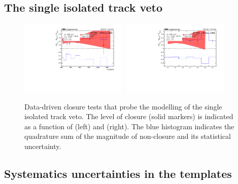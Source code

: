 \clearpage
\subsection{The single isolated track veto}

\begin{figure}[h!]
  \begin{center}
    \includegraphics[width=0.45\textwidth]{figures/closureTests/SITV/DoubleMu_Sit_ht.pdf}~
    \includegraphics[width=0.45\textwidth]{figures/closureTests/SITV/DoubleMu_Sit_nJet.pdf}\\
    \caption{Data-driven closure tests that probe the modelling of the
      single isolated track veto. The level of closure (solid markers)
      is indicated as a function of \scalht (left) and \njet
      (right). The blue histogram indicates the quadrature sum of the
      magnitude of non-closure and its statistical uncertainty. }
    \label{fig:closure_SITV_mumu}
  \end{center} 
\end{figure}

\clearpage
\subsection{Systematics uncertainties in the \texorpdfstring{\HTmiss}{MHT} templates}
\label{app:mht-zinv}

